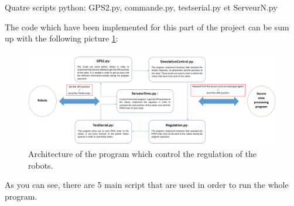

Quatre scripts python: GPS2.py, commande.py, testserial.py et ServeurN.py

The code which have been implemented for this part of the project can be sum up with the following picture \ref{fig:SyntheseCodeRegulationRobot}:

\begin{figure}[ht]
\centering
    \includegraphics[scale=0.5,angle=90]{SyntheseCodeRegulationRobot.PNG}
    \caption{Architecture of the program which control the regulation of the robots.}
    \label{fig:SyntheseCodeRegulationRobot}
\end{figure}

As you can see, there are 5 main script that are used in order to run the whole program.
\pagebreak
